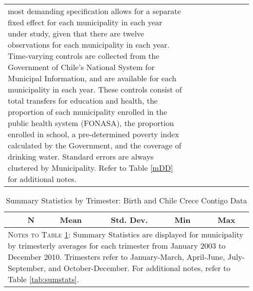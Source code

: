 \documentclass[12pt]{article}
\begin{document}
\begin{spacing}{1.4}
\begin{landscape}
\begin{table}[htpb!]
\begin{center}
\begin{tabular}{lcccccccc}
{{          most demanding specification allows for a separate fixed effect for each
          municipality in each year under study, given that there are twelve
          observations for each municipality in each year.  Time-varying controls are
          collected from the Government of Chile's National System for Municipal Information,
          and are available for each municipality in each year.  These controls consist
          of total transfers for education and health, the proportion of each municipality
          enrolled in the public health system (FONASA), the proportion enrolled in school,
          a pre-determined poverty index calculated by the Government, and the coverage
          of drinking water.  Standard errors are always clustered by Municipality. Refer
          to Table \ref{mDD} for additional notes.}} \\
    \end{tabular}
  \end{center}
\end{table}
\end{landscape}

\clearpage
\begin{table}[htpb!]
  \begin{center}
    \caption{Summary Statistics by Trimester: Birth and Chile Crece Contigo Data}
    \label{tab:sumstatsTri}
    \begin{tabular}{lccccc} \toprule
      & N& Mean & Std. Dev. & Min & Max \\ \midrule
       \bottomrule
      \multicolumn{6}{p{15.2cm}}{{\footnotesize \textsc{Notes to Table
            \ref{tab:sumstatsTri}}: Summary Statistics are displayed for
          municipality by trimesterly averages for
          each trimester from January 2003 to December 2010.  Trimesters
          refer to January-March, April-June, July-September, and
          October-December.  For additional notes, refer to Table
          \ref{tab:sumstats}.
      }}
      \end{tabular}
  \end{center}
\end{table}

\begin{landscape}

\end{landscape}


\end{spacing}
\end{document}
